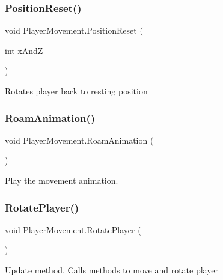 \subsubsection{\texorpdfstring{Position\+Reset()}{PositionReset()}}
{\footnotesize\ttfamily void Player\+Movement.\+Position\+Reset (\begin{DoxyParamCaption}\item[{int}]{x\+AndZ }\end{DoxyParamCaption})}



Rotates player back to resting position 

\mbox{\label{class_player_movement_a96683270dabdb0389c014c436aaf3cb6}} 
\subsubsection{\texorpdfstring{Roam\+Animation()}{RoamAnimation()}}
{\footnotesize\ttfamily void Player\+Movement.\+Roam\+Animation (\begin{DoxyParamCaption}{ }\end{DoxyParamCaption})\hspace{0.3cm}{\ttfamily [private]}}



Play the movement animation. 

\mbox{\label{class_player_movement_af5abbfc3a23ae53153afb7fc46588770}} 
\subsubsection{\texorpdfstring{Rotate\+Player()}{RotatePlayer()}}
{\footnotesize\ttfamily void Player\+Movement.\+Rotate\+Player (\begin{DoxyParamCaption}{ }\end{DoxyParamCaption})\hspace{0.3cm}{\ttfamily [private]}}



Update method. Calls methods to move and rotate player 

\mbox{\label{class_player_movement_af704bd9f7ca1cda2ba100a8ef631dbc9}} 
